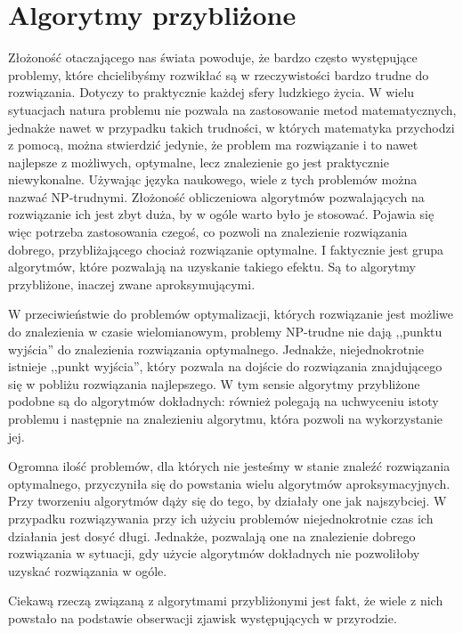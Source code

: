 \chapter{Algorytmy przybliżone}
\label{cha:algorytmy}

Złożoność otaczającego nas świata powoduje, że bardzo często występujące problemy, które chcielibyśmy rozwikłać są w rzeczywistości bardzo trudne do rozwiązania. Dotyczy to praktycznie każdej sfery ludzkiego życia. W wielu sytuacjach natura problemu nie pozwala na zastosowanie metod matematycznych, jednakże nawet w przypadku takich trudności, w których matematyka przychodzi z pomocą, można stwierdzić jedynie, że problem ma rozwiązanie i to nawet najlepsze z możliwych, optymalne, lecz znalezienie go jest praktycznie niewykonalne. Używając języka naukowego, wiele z tych problemów można nazwać NP-trudnymi. Złożoność obliczeniowa algorytmów pozwalających na rozwiązanie ich jest zbyt duża, by w ogóle warto było je stosować. Pojawia się więc potrzeba zastosowania czegoś, co pozwoli na znalezienie rozwiązania dobrego, przybliżającego chociaż rozwiązanie optymalne. I faktycznie jest grupa algorytmów, które pozwalają na uzyskanie takiego efektu. Są to algorytmy przybliżone, inaczej zwane aproksymującymi.

W przeciwieństwie do problemów optymalizacji, których rozwiązanie jest możliwe do znalezienia w czasie wielomianowym, problemy NP-trudne nie dają ,,punktu wyjścia'' do znalezienia rozwiązania optymalnego. Jednakże, niejednokrotnie istnieje ,,punkt wyjścia'', który pozwala na dojście do rozwiązania znajdującego się w pobliżu rozwiązania najlepszego. W tym sensie algorytmy przybliżone podobne są do algorytmów dokładnych: również polegają na uchwyceniu istoty problemu i następnie na znalezieniu algorytmu, która pozwoli na wykorzystanie jej.

Ogromna ilość problemów, dla których nie jesteśmy w stanie znaleźć rozwiązania optymalnego, przyczyniła się do powstania wielu algorytmów aproksymacyjnych.  Przy tworzeniu algorytmów dąży się do tego, by działały one jak najszybciej. W przypadku rozwiązywania przy ich użyciu problemów niejednokrotnie czas ich działania jest dosyć długi. Jednakże, pozwalają one na znalezienie dobrego rozwiązania w sytuacji, gdy użycie algorytmów dokładnych nie pozwoliłoby uzyskać rozwiązania w ogóle.

Ciekawą rzeczą związaną z algorytmami przybliżonymi jest fakt, że wiele z nich powstało na podstawie obserwacji zjawisk występujących w przyrodzie.

